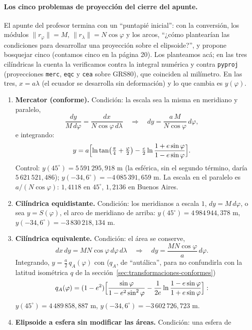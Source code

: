 \paragraph{Los cinco problemas de proyección del cierre del apunte.} El apunte del
profesor termina con un ``puntapié inicial'': con la conversión, los módulos
\(\|r_\varphi\|=M\), \(\|r_\lambda\|=N\cos\varphi\) y los arcos, ``¿cómo plantearían las
condiciones para desarrollar una proyección sobre el elipsoide?'', y propone bosquejar
cinco (contamos cinco en la página 20). Los planteamos acá; en las tres cilíndricas la cuenta la
verificamos contra la integral numérica y contra \texttt{pyproj} (proyecciones
\texttt{merc}, \texttt{eqc} y \texttt{cea} sobre GRS80), que coinciden al milímetro. En
las tres, \(x=a\lambda\) (el ecuador se desarrolla sin deformación) y lo que cambia es
\(y(\varphi)\).
\begin{enumerate}
  \item \textbf{Mercator (conforme).} Condición: la escala sea la misma en meridiano y
  paralelo,
  \[
    \frac{dy}{M\,d\varphi}=\frac{dx}{N\cos\varphi\,d\lambda}
    \quad\Longrightarrow\quad dy=\frac{a\,M}{N\cos\varphi}\,d\varphi ,
  \]
  e integrando:
  \[
    y=a\Bigl[\ln\tan\bigl(\tfrac\pi4+\tfrac\varphi2\bigr)
    -\tfrac e2\ln\frac{1+e\sin\varphi}{1-e\sin\varphi}\Bigr].
  \]
  Control: \(y(45^\circ)=5\,591\,295{,}918\) m (la esférica, sin el segundo término,
  daría \(5\,621\,521{,}486\)); \(y(-34{,}6^\circ)=-4\,085\,391{,}659\) m. La escala en el
  paralelo es \(a/(N\cos\varphi)\): \(1{,}4118\) en \(45^\circ\), \(1{,}2136\) en Buenos
  Aires.
  \item \textbf{Cilíndrica equidistante.} Condición: los meridianos a escala \(1\),
  \(dy=M\,d\varphi\), o sea \(y=S(\varphi)\), el arco de meridiano de arriba:
  \(y(45^\circ)=4\,984\,944{,}378\) m, \(y(-34{,}6^\circ)=-3\,830\,218{,}134\) m.
  \item \textbf{Cilíndrica equivalente.} Condición: el área se conserve,
  \[
    dx\,dy=MN\cos\varphi\,d\varphi\,d\lambda\quad\Longrightarrow\quad
    dy=\frac{MN\cos\varphi}{a}\,d\varphi .
  \]
  Integrando, \(y=\tfrac a2\,q_A(\varphi)\) con (\(q_A\), de ``autálica'', para no
  confundirla con la latitud isométrica \(q\) de la sección~\ref{sec:transformaciones-conformes})
  \[
    q_A(\varphi)=(1-e^2)\Bigl[\frac{\sin\varphi}{1-e^2\sin^2\varphi}
    -\frac1{2e}\ln\frac{1-e\sin\varphi}{1+e\sin\varphi}\Bigr]:
  \]
  \(y(45^\circ)=4\,489\,858{,}887\) m, \(y(-34{,}6^\circ)=-3\,602\,726{,}723\) m.
  \item \textbf{Elipsoide a esfera sin modificar las áreas.} Condición: una esfera de

\end{enumerate}
